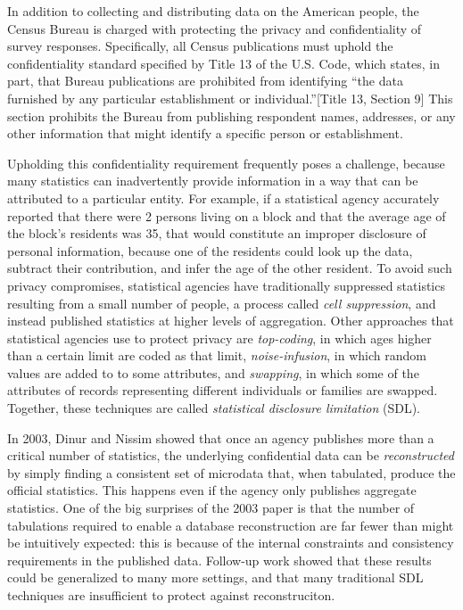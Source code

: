 \documentclass[runningheads]{llncs}
\begin{document}
In addition to collecting and distributing data on the American
people, the Census Bureau is charged with protecting the privacy and confidentiality of
survey responses. Specifically, all Census publications must uphold the
confidentiality standard specified by Title 13 of the U.S. Code, which
states, in part, that Bureau publications are prohibited from
identifying ``the data furnished by any particular
establishment or individual.''[Title 13, Section 9] This section
prohibits the Bureau from publishing respondent names, addresses, or any other
information that might identify a specific person or establishment.

Upholding this confidentiality requirement frequently poses a
challenge, because many statistics can inadvertently provide
information in a way that can be attributed to a particular
entity. For example, if a statistical agency accurately reported that
there were 2 persons living on a block and that the average age of the
block's residents was 35, that would constitute an improper disclosure
of personal information, because one of the residents could look up
the data, subtract their contribution, and infer the age of the other
resident. To avoid such privacy compromises, statistical agencies have
traditionally suppressed statistics resulting from a small number of
people, a process called \emph{cell suppression}, and instead
published statistics at higher levels of aggregation. Other approaches
that statistical agencies use to protect privacy are
\emph{top-coding}, in which ages higher than a certain limit are coded
as that limit, \emph{noise-infusion}, in which random values are added
to to some attributes, and \emph{swapping}, in which some of the
attributes of records representing different individuals or families
are swapped. Together, these techniques are called \emph{statistical
  disclosure limitation} (SDL).

In 2003, Dinur and Nissim showed that 
once an agency publishes more than a critical number of statistics,
the underlying confidential data can be \emph{reconstructed} by simply
finding a consistent set of microdata that, when tabulated, produce
the official statistics. This happens even if the agency only
publishes aggregate statistics. One of the big surprises of the 2003 paper is
that the number of tabulations required to enable a database reconstruction
are far fewer than might be intuitively expected: this is
because of the internal constraints and consistency requirements
in the published data. Follow-up work showed that these results could
be generalized to many more settings, and that many traditional
SDL techniques are insufficient to protect against reconstruciton.
\end{document}
